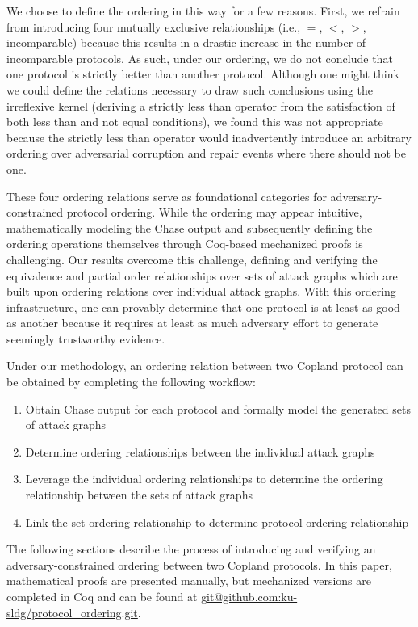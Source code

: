 \documentclass[runningheads]{llncs}
\theoremstyle{definition}
\newcommand{\squash}{\itemsep=0pt\parskip=0pt}
\begin{document}
\noindent We choose to define the ordering in this way for a few reasons. First, we refrain from introducing four mutually exclusive relationships (i.e., $=$, $<$, $>$, incomparable) because this results in a drastic increase in the number of incomparable protocols. As such, under our ordering, we do not conclude that one protocol is strictly better than another protocol. Although one might think we could define the relations necessary to draw such conclusions using the irreflexive kernel (deriving a strictly less than operator from the satisfaction of both less than and not equal conditions), we found this was not appropriate because the strictly less than operator would inadvertently introduce an arbitrary ordering over adversarial corruption and repair events where there should not be one.  


These four ordering relations serve as foundational categories for adversary-constrained protocol ordering. While the ordering may appear intuitive, mathematically modeling the Chase output and subsequently defining the ordering operations themselves through Coq-based mechanized proofs is challenging. Our results overcome this challenge, defining and verifying the equivalence and partial order relationships over sets of attack graphs which are built upon ordering relations over individual attack graphs. With this ordering infrastructure, one can provably determine that one protocol is at least as good as another because it requires at least as much adversary effort to generate seemingly trustworthy evidence. 

Under our methodology, an ordering relation between two Copland protocol can be obtained by completing the following workflow:

\begin{enumerate}
    \squash
    \item Obtain Chase output for each protocol and formally model the generated sets of attack graphs
    \item Determine ordering relationships between the individual attack graphs
    \item Leverage the individual ordering relationships to determine the ordering relationship between the sets of attack graphs
    \item Link the set ordering relationship to determine protocol ordering relationship
\end{enumerate}

The following sections describe the process of introducing and verifying an adversary-constrained ordering between two Copland protocols. In this paper, mathematical proofs are presented manually, but mechanized versions are completed in Coq and can be found at \url{git@github.com:ku-sldg/protocol_ordering.git}.
\end{document}
